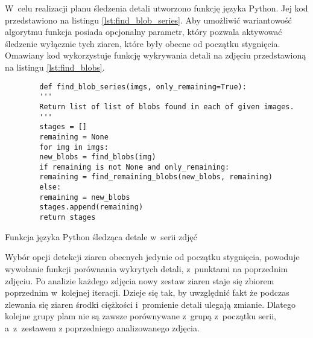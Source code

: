 W~celu realizacji planu śledzenia detali utworzono funkcję języka Python.
Jej kod przedstawiono na listingu \ref{lst:find_blob_series}.
Aby umożliwić wariantowość algorytmu funkcja posiada opcjonalny parametr,
który pozwala aktywować śledzenie wyłącznie tych ziaren, które były obecne od
początku stygnięcia.
Omawiany kod wykorzystuje funkcję wykrywania detali na zdjęciu przedstawioną
na listingu \ref{lst:find_blobs}.
\begin{listing}[htb]
	\begin{verbatim}
		def find_blob_series(imgs, only_remaining=True):
		'''
		Return list of list of blobs found in each of given images.
		'''
		stages = []
		remaining = None
		for img in imgs:
		new_blobs = find_blobs(img)
		if remaining is not None and only_remaining:
		remaining = find_remaining_blobs(new_blobs, remaining)
		else:
		remaining = new_blobs
		stages.append(remaining)
		return stages
	\end{verbatim}
	\caption{Funkcja języka Python śledząca detale w~serii zdjęć}
	\label{lst:find_blob_series}
\end{listing}
Wybór opcji detekcji ziaren obecnych jedynie od początku stygnięcia,
powoduje wywołanie funkcji porównania wykrytych detali, z~punktami
na poprzednim zdjęciu.
Po analizie każdego zdjęcia nowy zestaw ziaren staje się zbiorem poprzednim
w~kolejnej iteracji.
Dzieje się tak, by uwzględnić fakt że podczas zlewania się ziaren środki
ciężkości i~promienie detali ulegają zmianie.
Dlatego kolejne grupy plam nie są zawsze porównywane z~grupą z~początku
serii, a~z~zestawem z poprzedniego analizowanego zdjęcia.

